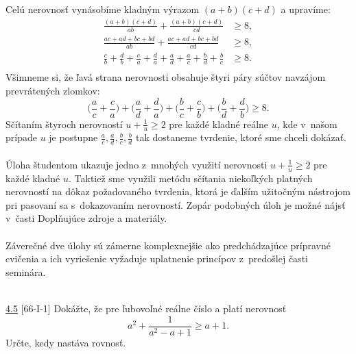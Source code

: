 \rie Celú nerovnosť vynásobíme kladným výrazom $(a+b)(c+d)$ a upravíme:
\begin{align*}
\frac{(a+b)(c+d)}{ab} + \frac{(a+b)(c+d)}{cd} &\geq 8, \\
\frac{ac+ad+bc+bd}{ab}+\frac{ac+ad+bc+bd}{cd} & \geq 8,\\
\frac{c}{b}+\frac{d}{b}+\frac{c}{a}+\frac{d}{a}+\frac{a}{d}+\frac{a}{c}+\frac{b}{d}+\frac{b}{c} &\geq 8.\\
\end{align*}
Všimneme si, že ľavá strana nerovnosti obsahuje štyri páry súčtov navzájom prevrátených zlomkov:
$$\bigg( \frac{a}{c}+ \frac{c}{a} \bigg)+\bigg( \frac{a}{d}+ \frac{d}{a} \bigg)+\bigg( \frac{b}{c}+ \frac{c}{b} \bigg)+\bigg( \frac{b}{d}+ \frac{d}{b} \bigg) \geq 8.$$
Sčítaním štyroch nerovností $u+\frac{1}{u} \geq 2$ pre každé kladné reálne $u$, kde v~našom prípade $u$ je postupne $\frac{a}{c}, \frac{a}{d}, \frac{b}{c}, \frac{b}{d}$ tak dostaneme tvrdenie, ktoré sme chceli dokázať.\\
\\
\kom Úloha študentom ukazuje jedno z~mnohých využití nerovnosti $u+\frac{1}{u} \geq 2$ pre každé kladné $u$. Taktiež sme využili metódu sčítania niekoľkých platných nerovností na dôkaz požadovaného tvrdenia, ktorá je ďalším užitočným nástrojom pri pasovaní sa s~dokazovaním nerovností. Zopár podobných úloh je možné nájsť v~časti Doplňujúce zdroje a materiály. \\
\\
\kom Záverečné dve úlohy sú zámerne komplexnejšie ako predchádzajúce prípravné cvičenia a ich vyriešenie vyžaduje uplatnenie princípov z~predošlej časti seminára. \\
\\
\begin{tcolorbox}[breakable,notitle,boxrule=0pt,colback=light-gray,colframe=light-gray]\ul{4.5} [66-I-1] Dokážte, že pre ľubovoľné reálne číslo a platí nerovnosť $$a^2+\frac{1}{a^2-a+1}\geq a+1.$$ Určte, kedy nastáva rovnosť.

\end{tcolorbox}

